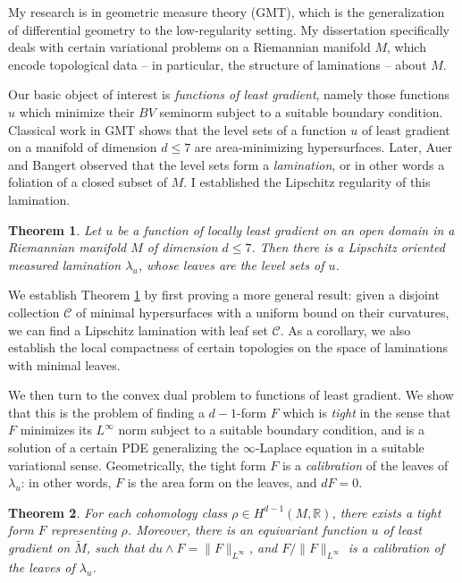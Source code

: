 \documentclass[11pt]{article}
\theoremstyle{plain} \numberwithin{equation}{section}
\newtheorem{theorem}{Theorem}%
\theoremstyle{definition}
\begin{document}

My research is in geometric measure theory (GMT), which is the generalization of differential geometry to the low-regularity setting.
My dissertation specifically deals with certain variational problems on a Riemannian manifold $M$, which encode topological data -- in particular, the structure of laminations -- about $M$.

Our basic object of interest is \emph{functions of least gradient}, namely those functions $u$ which minimize their $BV$ seminorm subject to a suitable boundary condition.
Classical work in GMT shows that the level sets of a function $u$ of least gradient on a manifold of dimension $d \leq 7$ are area-minimizing hypersurfaces.
Later, Auer and Bangert observed that the level sets form a \emph{lamination}, or in other words a foliation of a closed subset of $M$.
I established the Lipschitz regularity of this lamination.

\begin{theorem}\label{least gradient means lamination}
Let $u$ be a function of locally least gradient on an open domain in a Riemannian manifold $M$ of dimension $d \leq 7$.
Then there is a Lipschitz oriented measured lamination $\lambda_u$, whose leaves are the level sets of $u$.
\end{theorem}

We establish Theorem \ref{least gradient means lamination} by first proving a more general result: given a disjoint collection $\mathcal C$ of minimal hypersurfaces with a uniform bound on their curvatures, we can find a Lipschitz lamination with leaf set $\mathcal C$.
As a corollary, we also establish the local compactness of certain topologies on the space of laminations with minimal leaves.

We then turn to the convex dual problem to functions of least gradient.
We show that this is the problem of finding a $d - 1$-form $F$ which is \emph{tight} in the sense that $F$ minimizes its $L^\infty$ norm subject to a suitable boundary condition, and is a solution of a certain PDE generalizing the $\infty$-Laplace equation in a suitable variational sense.
Geometrically, the tight form $F$ is a \emph{calibration} of the leaves of $\lambda_u$: in other words, $F$ is the area form on the leaves, and $dF = 0$.

\begin{theorem}
For each cohomology class $\rho \in H^{d - 1}(M, \mathbb R)$, there exists a tight form $F$ representing $\rho$.
Moreover, there is an equivariant function $u$ of least gradient on $\tilde M$, such that $du \wedge F = \|F\|_{L^\infty}$, and $F/\|F\|_{L^\infty}$ is a calibration of the leaves of $\lambda_u$.
\end{theorem}
\end{document}
